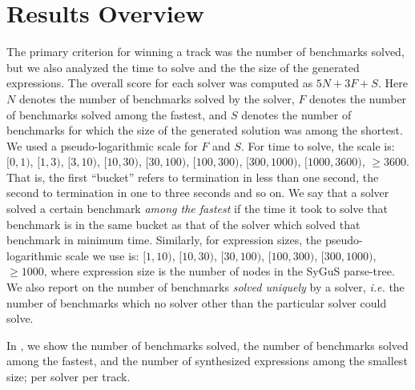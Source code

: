 \section{Results Overview}
\label{sec:comp-results}



The primary criterion for winning a track was the number of benchmarks solved,
but we also analyzed the time to solve and the the size of the generated expressions.
The overall score for each solver was computed as $5N + 3F + S$.
Here $N$ denotes the number of benchmarks solved by the solver,
$F$ denotes the number of benchmarks solved among the fastest,
and $S$ denotes the number of benchmarks for which the size of the generated solution was among the shortest.
We used a pseudo-logarithmic scale for $F$ and $S$.
For time to solve, the scale is: $[0,1)$, $[1,3)$, $[3,10)$, $[10,30)$, $[30, 100)$,
$[100,300)$, $[300, 1000)$, $[1000,3600)$, $\geqslant 3600$.
That is, the first ``bucket'' refers to termination in less than one second,
the second to termination in one to three seconds and so on.
We say that a solver solved a certain benchmark \emph{among the fastest}
if the time it took to solve that benchmark is in the same bucket
as that of the solver which solved that benchmark in minimum time.
Similarly, for expression sizes, the pseudo-logarithmic scale we use is:
$[1,10)$, $[10,30)$, $[30,100)$, $[100,300)$, $[300,1000)$, $\geqslant 1000$,
where expression size is the number of nodes in the SyGuS parse-tree.
We also report on the number of benchmarks \emph{solved uniquely} by a solver,
\emph{i.e.} the number of benchmarks which no solver other than the particular solver could solve.

In , we show the number of benchmarks solved,
the number of benchmarks solved among the fastest,
and the number of synthesized expressions among the smallest size;
per solver per track.

